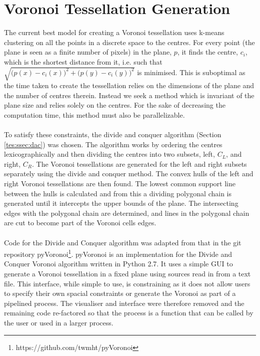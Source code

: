 \section{Voronoi Tessellation Generation}
The current best model for creating a Voronoi tessellation uses k-means clustering on all the points in a discrete space to the centres. For every point (the plane is seen as a finite number of pixels) in the plane, $p$, it finds the centre, $c_i$, which is the shortest distance from it, i.e. such that $\sqrt{\big(p(x)-c_i(x)\big)^2 + \big(p(y)-c_i(y)\big)^2}$ is minimised. This is suboptimal as the time taken to create the tessellation relies on the dimensions of the plane and the number of centres therein. Instead we seek a method which is invariant of the plane size and relies solely on the centres. For the sake of decreasing the computation time, this method must also be parallelizable. 
\\
\\
To satisfy these constraints, the divide and conquer algorithm (Section \ref{tes:ssec:dac}) was chosen. The algorithm works by ordering the centres lexicographically and then dividing the centres into two subsets, left, $C_L$, and right, $C_R$. The Voronoi tessellations are generated for the left and right subsets separately using the divide and conquer method. The convex hulls of the left and right Voronoi tessellations are then found. The lowest common support line between the hulls is calculated and from this a dividing polygonal chain is generated until it intercepts the upper bounds of the plane. The intersecting edges with the polygonal chain are determined, and lines in the polygonal chain are cut to become part of the Voronoi cells edges.
\\
\\
Code for the Divide and Conquer algorithm was adapted from that in the git repository pyVoronoi\footnote{https://github.com/twmht/pyVoronoi}. pyVoronoi is an implementation for the Divide and Conquer Voronoi algorithm written in Python 2.7. It uses a simple GUI to generate a Voronoi tessellation in a fixed plane using sources read in from a text file. This interface, while simple to use, is constraining as it does not allow users to specify their own spacial constraints or generate the Voronoi as part of a pipelined process. The visualiser and interface were therefore removed and the remaining code re-factored so that the process is a function that can be called by the user or used in a larger process.

